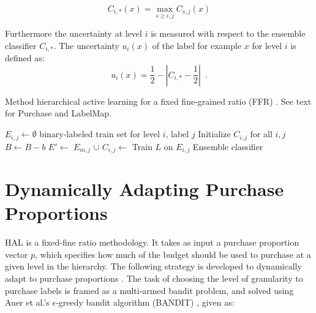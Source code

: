 \documentclass[ms]{nuthesis}
\begin{document}
\begin{equation}
\label{eq:maxcombine}
  C_{i,*}(x) = \max_{s\ge i,j} C_{s,j}(x)
\end{equation}


Furthermore the uncertainty at level $i$
is measured with respect to the ensemble classifier $C_{i,*}$. The
uncertainty $u_i(x)$ of the label for example $x$ for level $i$ is defined as: %
\begin{equation}
\label{eq:uncert}
 u_i(x) = \frac{1}{2} - \left| C_{i,*} - \frac{1}{2} \right|
\enspace .
\end{equation}



\begin{algorithm}[!htb]
\small{
\caption{Method hierarchical active learning for a fixed
fine-grained ratio (FFR) \cite{yugi}.
See text for Purchase and LabelMap.
}
\label{alg:halalgo}
\begin{algorithmic}
\State  $E_{i,j} \gets \emptyset$  \Comment binary-labeled train set for
level $i$, label $j$
\State Initialize $C_{i,j}$ for all $i, j$
  \State $B \gets B-b$
    \State $E' \gets$ 
           \State $E_{m,j}$ $\cup$ 
       \EndFor
    \EndFor
  \EndFor
    \State $C_{i,j} \gets$ Train $L$ on $E_{i,j}$
  \EndFor
  \EndFor
\EndWhile
\State \Return Ensemble classifier
\EndFunction
\end{algorithmic}
}
\end{algorithm}

\section{Dynamically Adapting Purchase Proportions}
\label{sect:BANDIT}
HAL is a fixed-fine ratio methodology. It takes as input a purchase proportion
vector $p$, which specifies how much of the budget should be used to purchase at
a given level in the hierarchy. The following strategy is developed to
dynamically adapt to purchase proportions \cite{yugi}. The task of choosing the
level of granularity to purchase labels is framed as a multi-armed bandit problem,
and solved using Auer et al.'s $\epsilon$-greedy bandit algorithm (BANDIT) \cite{Auer2002}, given as:
\end{document}
